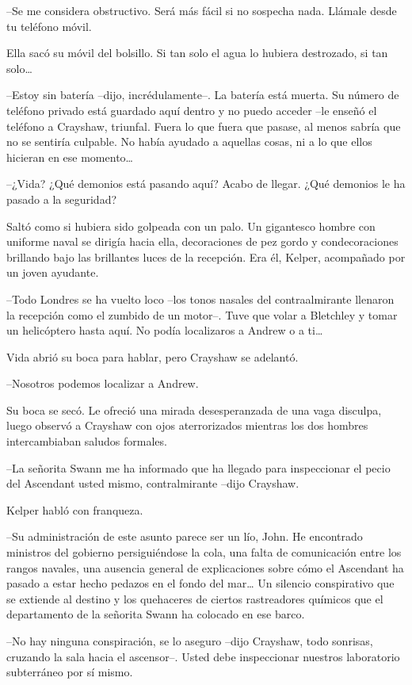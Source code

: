 {--Se me considera obstructivo. Será más fácil si no sospecha nada.
Llámale desde tu teléfono móvil.}

{Ella sacó su móvil del bolsillo. Si tan solo el agua lo hubiera
 destrozado, si tan solo\ldots{}}

{--Estoy sin batería --dijo, incrédulamente--. La batería está muerta.
 Su número de teléfono privado está guardado aquí dentro y no puedo
 acceder --le enseñó el teléfono a Crayshaw, triunfal. Fuera lo que fuera
 que pasase, al menos sabría que no se sentiría culpable. No había
 ayudado a aquellas cosas, ni a lo que ellos hicieran en ese
 momento\ldots{}}

{--¿Vida? ¿Qué demonios está pasando aquí? Acabo de llegar. ¿Qué
demonios le ha pasado a la seguridad?}

{Saltó como si hubiera sido golpeada con un palo. Un gigantesco hombre
 con uniforme naval se dirigía hacia ella, decoraciones de pez gordo y
 condecoraciones brillando bajo las brillantes luces de la recepción. Era
él, Kelper, acompañado por un joven ayudante.}

{--Todo Londres se ha vuelto loco --los tonos nasales del
 contraalmirante llenaron la recepción como el zumbido de un motor--.
 Tuve que volar a Bletchley y tomar un helicóptero hasta aquí. No podía
 localizaros a Andrew o a ti\ldots{}}

{Vida abrió su boca para hablar, pero Crayshaw se adelantó.}

{--Nosotros podemos localizar a Andrew.}

{Su boca se secó. Le ofreció una mirada desesperanzada de una vaga
 disculpa, luego observó a Crayshaw con ojos aterrorizados mientras los
dos hombres intercambiaban saludos formales.}

{--La señorita Swann me ha informado que ha llegado para inspeccionar el
pecio del Ascendant usted mismo, contralmirante --dijo Crayshaw.}

{Kelper habló con franqueza.}

{--Su administración de este asunto parece ser un lío, John. He
 encontrado ministros del gobierno persiguiéndose la cola, una falta de
 comunicación entre los rangos navales, una ausencia general de
 explicaciones sobre cómo el Ascendant ha pasado a estar hecho pedazos en
 el fondo del mar\ldots{} Un silencio conspirativo que se extiende al
 destino y los quehaceres de ciertos rastreadores químicos que el
departamento de la señorita Swann ha colocado en ese barco.}

{--No hay ninguna conspiración, se lo aseguro --dijo Crayshaw, todo
 sonrisas, cruzando la sala hacia el ascensor--. Usted debe inspeccionar
nuestros laboratorio subterráneo por sí mismo.}

